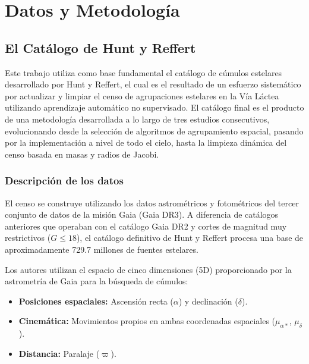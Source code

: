 
\chapter{Datos y Metodología}
\label{cap:metodologia}

\section{El Catálogo de Hunt y Reffert}

    Este trabajo utiliza como base fundamental el catálogo de cúmulos estelares 
    desarrollado por Hunt y Reffert, el cual es el resultado de un esfuerzo 
    sistemático por actualizar y limpiar el censo de agrupaciones estelares en 
    la Vía Láctea utilizando aprendizaje automático no supervisado. El catálogo 
    final es el producto de una metodología desarrollada a lo largo de tres 
    estudios consecutivos, evolucionando desde la selección de algoritmos de 
    agrupamiento espacial, pasando por la implementación a nivel de todo el 
    cielo, hasta la limpieza dinámica del censo basada en masas y radios de 
    Jacobi.

    \subsection{Descripción de los datos}

        El censo se construye utilizando los datos astrométricos y fotométricos 
        del tercer conjunto de datos de la misión Gaia (Gaia DR3). A diferencia 
        de catálogos anteriores que operaban con el catálogo Gaia DR2 y cortes 
        de magnitud muy restrictivos ($G \le 18$), el catálogo definitivo de 
        Hunt y Reffert procesa una base de aproximadamente 729.7 millones de 
        fuentes estelares.

        Los autores utilizan el espacio de cinco dimensiones (5D) proporcionado 
        por la astrometría de Gaia para la búsqueda de cúmulos:

        \begin{itemize}
            \item \textbf{Posiciones espaciales:} Ascensión recta ($\alpha$) y 
            declinación ($\delta$).

            \item \textbf{Cinemática:} Movimientos propios en ambas coordenadas 
            espaciales ($\mu_{\alpha*}$, $\mu_\delta$).

            \item \textbf{Distancia:} Paralaje ($\varpi$).
        \end{itemize}

